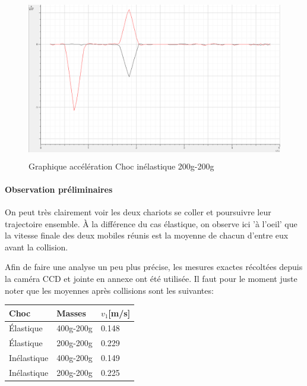 \newpage

\begin{figure}[h]
    \caption[Graphique accélération Choc inélastique 200g-200g]{Graphique accélération Choc inélastique 200g-200g}
    \centering
    \includegraphics[height=19em]{Data/200-200inela02a.png}
\end{figure}

\paragraph{Observation préliminaires}
On peut très clairement voir les deux chariots se coller et poursuivre leur trajectoire ensemble.
À la différence du cas élastique, on observe ici 'à l'oeil' que la vitesse finale des deux mobiles réunis est la moyenne de chacun d'entre eux avant la collision.

Afin de faire une analyse un peu plus précise, les mesures exactes récoltées depuis la caméra CCD et jointe en annexe ont été utilisée. Il faut pour le moment juste noter que les moyennes après collisions sont les suivantes:

\begin{table}[h]
    \centering
    \begin{tabular}{|l|l|l|}
	\hline
	Choc & Masses & $v_1$[m/s] \\
	\hline
	Élastique & 400g-200g & 0.148   \\
	Élastique & 200g-200g & 0.229   \\
	Inélastique & 400g-200g & 0.149 \\
	Inélastique & 200g-200g & 0.225 \\
	\hline
    \end{tabular}
\end{table}

